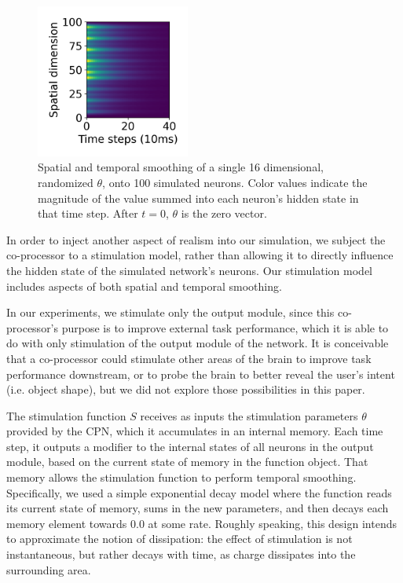 \documentclass[12pt]{iopart}
\begin{document}
\begin{figure}[h]
	\includegraphics[width=0.45\textwidth]{stim_single.png}
	\caption{Spatial and temporal smoothing of a single 16 dimensional,
	         randomized $\theta$, onto 100 simulated neurons.
		 Color values indicate the magnitude of the value summed into
		 each neuron's hidden state in that time step. After $t=0$,
		 $\theta$ is the zero vector.}
	\centering
	\label{fig:stim_single}
\end{figure}

In order to inject another aspect of realism into our simulation, we subject
the co-processor to a stimulation model, rather than allowing it to directly
influence the hidden state of the simulated network's neurons. Our stimulation
model includes aspects of both spatial and temporal smoothing.

In our experiments, we stimulate only the output module, since this co-processor's
purpose is to improve external task performance, which it is able to do with
only stimulation of the output module of the network. It is conceivable that
a co-processor could stimulate other areas of the brain to improve task performance
downstream, or to probe the brain to better reveal the user's intent (i.e. object
shape), but we did not explore those possibilities in this paper.

The stimulation function $S$ receives as inputs the stimulation parameters $\theta$
provided by the CPN, which it accumulates in an internal memory. Each time step,
it outputs a modifier to the internal states of all neurons in the output module,
based on the current state of memory in the function object. That memory allows
the stimulation function to perform temporal smoothing. Specifically, we used a
simple exponential decay model where the function reads its current state of memory,
sums in the new parameters, and then decays each memory element towards $0.0$ at some
rate. Roughly speaking, this design intends to approximate the notion of dissipation: the
effect of stimulation is not instantaneous, but rather decays with time, as charge
dissipates into the surrounding area.
\end{document}
